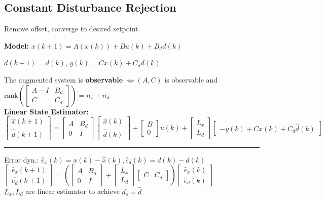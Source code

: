 \documentclass[10pt,a4paper,landscape]{article}
\newcommand{\quadRule}{\vspace{-3pt}\rule{0.23\textwidth}{0.4pt}}
\begin{document}
\begin{multicols*}{4}
\subsection{Constant Disturbance Rejection}
Remove offset, converge to desired setpoint

\textbf{Model:} $x(k+1) = A(x(k)) + Bu(k) + B_dd(k)$

$d(k+1) = d(k)$, $y(k) = Cx(k) + C_d d(k)$

The augmented system is \textbf{observable} $\iff (A,C)$ is observable and $\mathrm{rank} \left( \begin{bmatrix}
	A-I & B_d \\C & C_d
\end{bmatrix} \right) = n_x + n_d$\\

\textbf{Linear State Estimator:}\\
$
\begin{bmatrix} \hat{x}(k+1) \\ \hat{d}(k+1) \end{bmatrix} = \begin{bmatrix} A & B_d \\ 0 & I \end{bmatrix} 
\begin{bmatrix} \hat{x}(k) \\ \hat{d}(k) \end{bmatrix} + 
\begin{bmatrix} B \\ 0 \end{bmatrix} u(k) + 
\begin{bmatrix} L_x \\ L_d \end{bmatrix} 
\begin{bmatrix} -y(k) + C\hat{x}(k) + C_d \hat{d}(k) \end{bmatrix}
$

\quadRule

Error dyn.: $\hat{e}_x(k) = x(k) - \hat{x}(k),\hat{e}_d(k) = d(k) - \hat{d}(k)$
$
\begin{bmatrix} \hat{e}_x(k+1) \\ \hat{e_d}(k+1) \end{bmatrix} =
\left(
\begin{bmatrix} A & B_d \\ 0 & I \end{bmatrix} +
\begin{bmatrix} L_x \\ L_d \end{bmatrix} 
\begin{bmatrix} C & C_d \end{bmatrix} 
\right)  
\begin{bmatrix} \hat{e}_x(k) \\ \hat{e}_d(k) \end{bmatrix}
$\\
$L_x, L_d$ are linear estimator to achieve $d_s = \hat{d}$


\end{multicols*}
\end{document}
